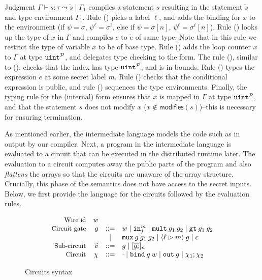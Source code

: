 Judgment $\Gamma \vdash s : \tau \leadsto \widetilde{s} \mid \Gamma_{1}$
compiles a statement $s$ resulting in the statement $\widetilde{s}$
and type environment $\Gamma_{1}$. Rule ({}) picks a label
$\ell$, and adds the binding for $x$ to the environment (if $\psi =
\sigma$, $\psi^\ell = \sigma^\ell$, else if $\psi = \sigma[n]$,
$\psi^\ell = \sigma^\ell[n]$).
Rule ({}) looks up the type of $x$ in $\Gamma$ and compiles $e$ to $\tilde{e}$ of same type.
Note that in this rule we restrict the type of variable $x$ to be of base type.
Rule ({}) adds the loop counter $x$ to $\Gamma$ at type
${\mathtt{uint}}^{\mathcal{P}}$, and delegates type checking to the
 form. The rule ({}), similar to ({}),
checks that the index has type ${\mathtt{uint}}^{\mathcal{P}}$, and is in
bounds. Rule ({})
types the expression $e$ at some secret label $m$. Rule ({})
checks that the conditional expression is public, and rule
({}) sequences the type environments. Finally, the typing
rule for the (internal)  form ensures that $x$ is mapped in
$\Gamma$ at type ${\mathtt{uint}}^{\mathcal{P}}$, and that the statement $s$
does not modify $x$ ($x \notin
\mathsf{modifies}(s)$)--this is necessary for ensuring termination.



As mentioned earlier, the intermediate language models the code such
as in  output by our compiler.
Next, a program in the intermediate language is evaluated to a circuit
that can be executed in the distributed runtime later. The evaluation
to a circuit computes away the public parts of the program and also
\emph{flattens} the arrays so that the circuits are unaware of the
array structure.
Crucially, this phase of the semantics does not have access to the
secret inputs.
Below, we first provide the language for the circuits followed by the
evaluation rules.


\begin{figure}
  \small
  \[
  \begin{array}{rrcl}
    \text{\small{Wire id}} & w &&\\
    \text{\small{Circuit gate}} & {g} & ::= & w \mid {\ensuremath{\mathtt{in}}}^{m}_{j} \mid {\ensuremath{\mathtt{mult}}}\:{g}_1\:{g}_{2} \mid {\ensuremath{\mathtt{gt}}}\:{g}_{1}\:{g}_{2}\\
    & & \mid & {\mathtt{mux}}\:{g}\:{g}_{1}\:{g}_{2} \mid \langle \ell
    \rhd m \rangle\:{g} \mid c\\
    \text{\small{Sub-circuit}} & \widetilde{v} & ::= & {g} \mid [\overline{{g}_{i}}]_{n}\\
    \text{\small{Circuit}} & \chi & ::= & \cdot \mid {\ensuremath{\mathtt{bind}}}\:{g}\:w \mid {\ensuremath{\mathtt{out}}}\:{g} \mid \chi_{1}; \chi_{2}
  \end{array}
  \]
\caption{Circuits  syntax}
\label{fig:circuits}
\end{figure}







